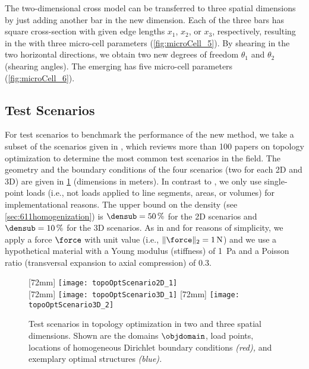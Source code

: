 The two-dimensional cross model can be transferred to three
spatial dimensions by just adding another bar in the new dimension.
Each of the three bars has square cross-section with given edge lengths
$x_1$, $x_2$, or $x_3$, respectively,
resulting in the  with three micro-cell parameters
(\cref{fig:microCell_5}).
By shearing in the two horizontal directions,
we obtain two new degrees of freedom $\theta_1$ and $\theta_2$
(shearing angles).
The emerging  has five micro-cell parameters
(\cref{fig:microCell_6}).



\subsection{Test Scenarios}
\label{sec:632scenarios}


For test scenarios to benchmark the performance of the new method,
we take a subset of the scenarios given in \cite{Valdez17Topology},
which reviews more than 100 papers on topology optimization
to determine the most common test scenarios in the field.
The geometry and the boundary conditions of the
four scenarios (two for each 2D and 3D)
are given in \cref{fig:topoOptScenario} (dimensions in meters).
In contrast to \cite{Valdez17Topology},
we only use single-point loads
(i.e., not loads applied to line segments, areas, or volumes)
for implementational reasons.
The upper bound on the density (see \cref{sec:611homogenization})
is $\densub = \SI{50}{\percent}$ for the 2D scenarios and
$\densub = \SI{10}{\percent}$ for the 3D scenarios.
As in \cite{Sigmund01Line} and for reasons of simplicity,
we apply a force $\force$ with unit value
(i.e., $\norm[2]{\force} = \SI{1}{\newton}$)
and we use a hypothetical material with
a Young modulus (stiffness) of \SI{1}{\pascal} and
a Poisson ratio (transversal expansion to axial compression) of $0.3$.

\begin{figure}
  [72mm]{%
    \texttt{[image: topoOptScenario2D\_1]}%
  }%
  \hfill%
  \\[7mm]%
  [72mm]{%
    \texttt{[image: topoOptScenario3D\_1]}%
  }%
  \hfill%
  [72mm]{%
    \texttt{[image: topoOptScenario3D\_2]}%
  }%
  \caption[Test scenarios in topology optimization]{%
    Test scenarios in topology optimization in
    two and three spatial dimensions.
    Shown are
    the domains $\objdomain$,
    load points,
    locations of homogeneous Dirichlet boundary conditions
    \emph{\textcolor{C1}{(red)},} and
    exemplary optimal structures \emph{\textcolor{C0}{(blue)}.}%
  }%
  \label{fig:topoOptScenario}%
\end{figure}

